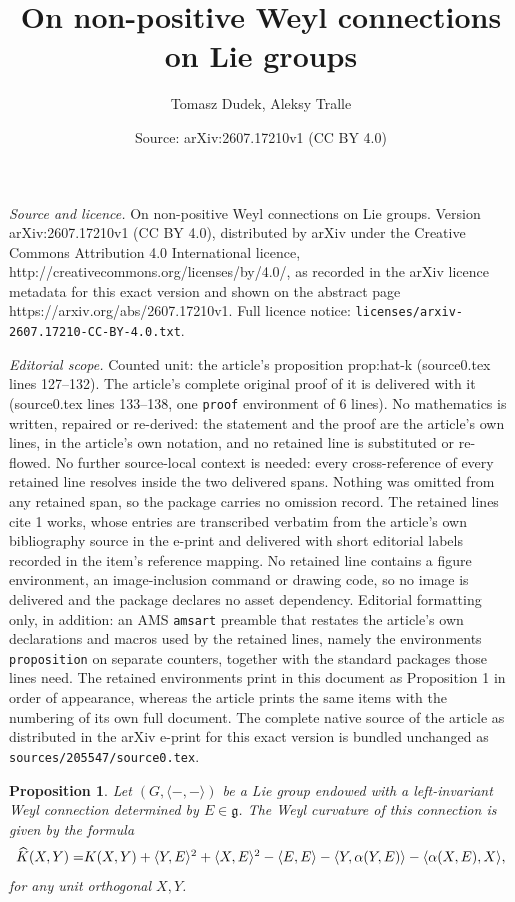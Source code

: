 \documentclass[10pt,a4paper]{amsart}
\title{On non-positive Weyl connections on Lie groups}
\author{Tomasz Dudek, Aleksy Tralle}
\date{Source: arXiv:2607.17210v1 (CC BY 4.0)}
\newtheorem{proposition}{Proposition}
\begin{document}
\maketitle

\noindent\emph{Source and licence.} On non-positive Weyl connections on Lie groups. Version arXiv:2607.17210v1 (CC BY 4.0), distributed by arXiv under the Creative Commons Attribution 4.0 International licence, http://creativecommons.org/licenses/by/4.0/, as recorded in the arXiv licence metadata for this exact version and shown on the abstract page https://arxiv.org/abs/2607.17210v1. Full licence notice: \texttt{licenses/arxiv-2607.17210-CC-BY-4.0.txt}.\par\smallskip

\noindent\textit{Editorial scope.} Counted unit: the article's proposition prop:hat-k (source0.tex lines 127--132). The article's complete original proof of it is delivered with it (source0.tex lines 133--138, one \texttt{proof} environment of 6 lines). No mathematics is written, repaired or re-derived: the statement and the proof are the article's own lines, in the article's own notation, and no retained line is substituted or re-flowed.  No further source-local context is needed: every cross-reference of every retained line resolves inside the two delivered spans.  Nothing was omitted from any retained span, so the package carries no omission record.  The retained lines cite 1 works, whose entries are transcribed verbatim from the article's own bibliography source in the e-print and delivered with short editorial labels recorded in the item's reference mapping.  No retained line contains a figure environment, an image-inclusion command or drawing code, so no image is delivered and the package declares no asset dependency.  Editorial formatting only, in addition: an AMS \texttt{amsart} preamble that restates the article's own declarations and macros used by the retained lines, namely the environments \texttt{proposition} on separate counters, together with the standard packages those lines need.  The retained environments print in this document as Proposition 1 in order of appearance, whereas the article prints the same items with the numbering of its own full document.  The complete native source of the article as distributed in the arXiv e-print for this exact version is bundled unchanged as \texttt{sources/205547/source0.tex}.
\begin{proposition}\label{prop:hat-k} Let $(G,\langle -,-\rangle)$ be a Lie group endowed with a left-invariant Weyl connection determined by $E\in\mathfrak{g}$. The Weyl curvature of this connection is given by the formula
 \begin{equation}\widehat{K}(X,Y) =$$
$$ K(X,Y)  + \langle {Y},{E}\rangle^2 + \langle {X},{E}\rangle^2 - \langle{E},{E}\rangle - \langle{Y},{\alpha(Y,E)}\rangle  - \langle{\alpha(X,E)},{X}\rangle,
\end{equation}
for any unit orthogonal $X,Y$.
\end{proposition}
\end{document}
